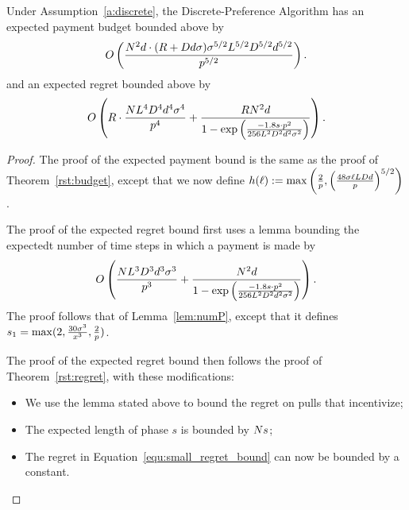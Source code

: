 
\begin{theorem}
\label{rst:discrete}
Under Assumption~\ref{a:discrete}, the Discrete-Preference Algorithm has an expected payment budget bounded above by 
\begin{align*}
O \left(\frac{N^2 d \cdot (R + D d \sigma)\sigma^{5/2}L^{5/2}D^{5/2}d^{5/2}}{p^{5/2}} \right). 
\end{align*}
and an expected regret bounded above by 
\begin{align}
O \left(R\cdot \frac{N L^4 D^4 d^4 \sigma^4}{p^4}
  + \frac{R N^2 d}{1 - \exp \left(
    \frac{-1.8 s \cdot p^2}{256 L^2 D^2 d^2 \sigma^2}
  \right)} \right).  \nonumber
\end{align}
\end{theorem}

\begin{proof}
The proof of the expected payment bound is the same as the proof of Theorem~\ref{rst:budget}, except that we now define $h(\ell) := \max \left( \frac{2}{p},
\left( \frac{48 \sigma \ell L D d}{p} \right)^{5/2}
\right)$.

The proof of the expected regret bound first uses a lemma bounding the expectedt number of time steps in which a payment is made by 
\begin{align}
O\left(\frac{N L^3 D^3 d^3 \sigma^3}{p^3}
  + \frac{N^2 d}{1 - \exp \left(
    \frac{-1.8 s \cdot p^2}{256 L^2 D^2 d^2 \sigma^2}
  \right)} \right). \nonumber 
\end{align}
The proof follows that of Lemma~\ref{lem:numP}, except that it defines $s_1 = \max (2, \frac{30 \sigma^3}{x^3}, \frac{2}{p})$.

The proof of the expected regret bound then follows the proof of Theorem~\ref{rst:regret}, with these modifications:
\begin{itemize}
\item We use the lemma stated above to bound the regret on pulls that incentivize;
\item The expected length of phase $s$ is bounded by $N s$;
\item The regret in Equation~\ref{equ:small_regret_bound} can now be bounded by a constant.
\end{itemize}
\end{proof}


